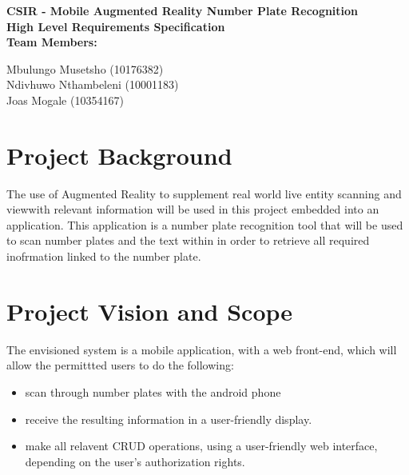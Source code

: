 \documentclass[12pt]{article}
\newcommand{\Title}{CSIR - Mobile Augmented Reality Number Plate Recognition} %
\begin{document}
        \vspace{4em}
        
        \begin{center}%
        	
		
          \LARGE \bf \Title \\[4em]
          \LARGE {\bf High Level Requirements Specification}\\[1em]
          \LARGE {\bf Team Members:}\\[2em]
          \large
          
             Mbulungo Musetsho                          (10176382) \\[1em]
             Ndivhuwo Nthambeleni (10001183)	\\[1em]
             Joas Mogale (10354167)		\\[1em]
            
        \end{center}%
        

        \newpage
        \tableofcontents    
                \newpage
                \section{Project Background}
               	\vspace{0.1in}
               	The use of Augmented Reality to supplement real world live entity scanning and viewwith relevant information will be used in this project embedded into an application. This application is a number plate recognition tool that will be used to scan number plates and the text within in order to retrieve all required inofrmation linked to the number plate.
               	
               	\vspace{0.2in}
                \section{Project Vision and Scope}
                \vspace{0.1in}
                The envisioned system is a mobile application, with a web front-end, which will allow the permittted users to do the following:
                \begin{itemize}
	                \item scan through number plates with the android phone
	                \item receive the resulting information in a user-friendly display.
	                \item make all relavent CRUD operations, using a user-friendly web interface,  depending on the user's authorization rights.
	                
                \end{itemize}
                
\end{document}
